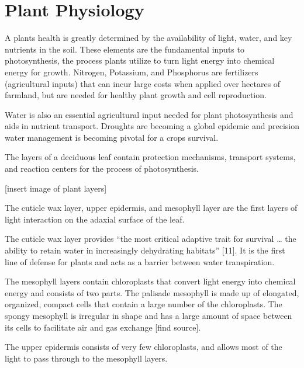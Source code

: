 \section{Plant Physiology}
A plants health is greatly determined by the availability of light, water, and key nutrients in the soil.  These elements are the fundamental inputs to photosynthesis, the process plants utilize to turn light energy into chemical energy for growth.  Nitrogen, Potassium, and Phosphorus are fertilizers (agricultural inputs) that can incur large costs when applied over hectares of farmland, but are needed for healthy plant growth and cell reproduction.

Water is also an essential agricultural input needed for plant photosynthesis and aids in nutrient transport.  Droughts are becoming a global epidemic and precision water management is becoming pivotal for a crops survival.

The layers of a deciduous leaf contain protection mechanisms, transport systems, and reaction centers for the process of photosynthesis.

[insert image of plant layers]

The cuticle wax layer, upper epidermis, and mesophyll layer are the first layers of light interaction on the adaxial surface of the leaf.

The cuticle wax layer provides “the most critical adaptive trait for survival … the ability to retain water in increasingly dehydrating habitats” [11].  It is the first line of defense for plants and acts as a barrier between water transpiration.

The mesophyll layers contain chloroplasts that convert light energy into chemical energy and consists of two parts. The palisade mesophyll is made up of elongated, organized, compact cells that contain a large number of the chloroplasts.  The spongy mesophyll is irregular in shape and has a large amount of space between its cells to facilitate air and gas exchange [find source].

The upper epidermis consists of very few chloroplasts, and allows most of the light to pass through to the mesophyll layers.




